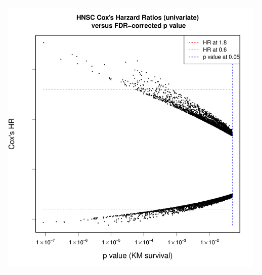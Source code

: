 \documentclass[
paper=landscape,
paper=160mm:90mm, %
fontsize=11pt, %
pagesize, %
parskip=half-, %
]{scrartcl} %
\theoremstyle{mythmstyle} %
\begin{document}
\begin{figure}[ht]


    \begin{subfigure}[t]{0.4\textwidth}
        \includegraphics[width=6.5cm]{Rplot02_FDRP_uniHR.pdf}  %


\end{subfigure}
\end{figure}
\end{document}
